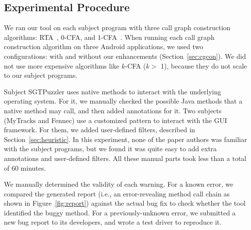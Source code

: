 \smallstep
\tinystep

\vspace{-3mm}
\subsection{Experimental Procedure}
\label{sec:procedural}

We ran our tool on each subject program with three call graph construction
algorithms: RTA~\cite{rta}, 0-CFA, and 1-CFA~\cite{kcfa}.  When running
each call graph construction algorithm on three Android applications, we
used two configurations: with and without our enhancements
(Section~\ref{sec:cgcon}).  We did not use more expensive algorithms like $k$-CFA ($k >$ 1),
because they do not scale to our subject programs.

Subject SGTPuzzler uses native methods to interact with
the underlying operating system. For it, we manually checked the possible
Java methods that a native method may call, and then added \annotationnum {}
annotations for it. 
Two subjects (MyTracks and Fennec)
use a customized pattern to interact with the GUI framework.
For them, we added \filternum user-defined filters, described in Section~\ref{sec:heuristic}.
In this experiment, none of the paper
authors was familiar with the subject programs, but we found it was quite easy
to add extra annotations and user-defined filters. All these
manual parts took less than a total of 60 minutes.

We manually determined the validity of each warning.
For a known error, we compared the generated report (i.e., an
error-revealing method call chain as shown in Figure~\ref{fig:report}) against the
actual bug fix to check whether the tool identified the
buggy method. For a previously-unknown error, we submitted a new bug
report to its developers, and wrote a test driver to reproduce it.


